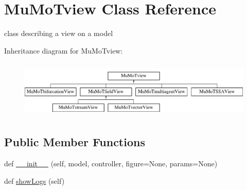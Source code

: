 \hypertarget{class_mu_mo_t_1_1_mu_mo_tview}{}\section{Mu\+Mo\+Tview Class Reference}
\label{class_mu_mo_t_1_1_mu_mo_tview}


class describing a view on a model  


Inheritance diagram for Mu\+Mo\+Tview\+:\begin{figure}[H]
\begin{center}
\leavevmode
\includegraphics[height=2.781457cm]{class_mu_mo_t_1_1_mu_mo_tview}
\end{center}
\end{figure}
\subsection*{Public Member Functions}
\begin{DoxyCompactItemize}
\item 
def \hyperlink{class_mu_mo_t_1_1_mu_mo_tview_afc93b937eb36816d9e603a372788f55b}{\+\_\+\+\_\+init\+\_\+\+\_\+} (self, model, controller, figure=None, params=None)
\item 
def \hyperlink{class_mu_mo_t_1_1_mu_mo_tview_aca4d648d909f4722c7e07197675500bb}{show\+Logs} (self)
\end{DoxyCompactItemize}
